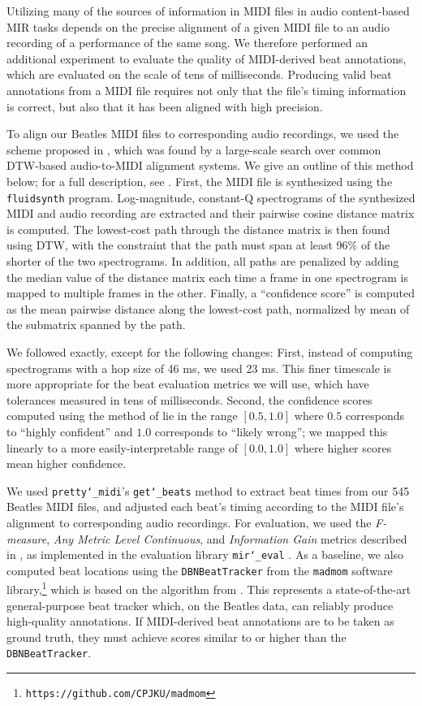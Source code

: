 \documentclass{article}
\begin{document}
Utilizing many of the sources of information in MIDI files in audio content-based MIR tasks depends on the precise alignment of a given MIDI file to an audio recording of a performance of the same song.
We therefore performed an additional experiment to evaluate the quality of MIDI-derived beat annotations, which are evaluated on the scale of tens of milliseconds.
Producing valid beat annotations from a MIDI file requires not only that the file's timing information is correct, but also that it has been aligned with high precision.

To align our Beatles MIDI files to corresponding audio recordings, we used the scheme proposed in \cite{raffel2016optimizing}, which was found by a large-scale search over common DTW-based audio-to-MIDI alignment systems.
We give an outline of this method below; for a full description, see \cite{raffel2016optimizing}.
First, the MIDI file is synthesized using the \texttt{fluidsynth} program.
Log-magnitude, constant-Q spectrograms of the synthesized MIDI and audio recording are extracted and their pairwise cosine distance matrix is computed.
The lowest-cost path through the distance matrix is then found using DTW, with the constraint that the path must span at least 96\% of the shorter of the two spectrograms.
In addition, all paths are penalized by adding the median value of the distance matrix each time a frame in one spectrogram is mapped to multiple frames in the other.
Finally, a ``confidence score'' is computed as the mean pairwise distance along the lowest-cost path, normalized by mean of the submatrix spanned by the path.

We followed \cite{raffel2016optimizing} exactly, except for the following changes:
First, instead of computing spectrograms with a hop size of 46 ms, we used 23 ms.
This finer timescale is more appropriate for the beat evaluation metrics we will use, which have tolerances measured in tens of milliseconds.
Second, the confidence scores computed using the method of \cite{raffel2016optimizing} lie in the range $[0.5, 1.0]$ where $0.5$ corresponds to ``highly confident'' and $1.0$ corresponds to ``likely wrong''; we mapped this linearly to a more easily-interpretable range of $[0.0, 1.0]$ where higher scores mean higher confidence.

We used \texttt{pretty\char`_midi}'s \texttt{get\char`_beats} method to extract beat times from our 545 Beatles MIDI files, and adjusted each beat's timing according to the MIDI file's alignment to corresponding audio recordings.
For evaluation, we used the {\em F-measure}, {\em Any Metric Level Continuous}, and {\em Information Gain} metrics described in \cite{davies2009evaluation}, as implemented in the evaluation library \texttt{mir\char`_eval} \cite{raffel2014mir_eval}.
As a baseline, we also computed beat locations using the \texttt{DBNBeatTracker} from the \texttt{madmom} software library,\footnote{\texttt{https://github.com/CPJKU/madmom}} which is based on the algorithm from \cite{bock2014multi}.
This represents a state-of-the-art general-purpose beat tracker which, on the Beatles data, can reliably produce high-quality annotations.
If MIDI-derived beat annotations are to be taken as ground truth, they must achieve scores similar to or higher than the \texttt{DBNBeatTracker}.
\end{document}
